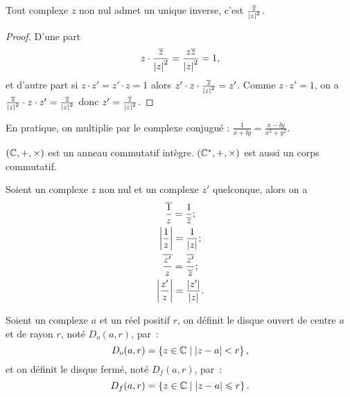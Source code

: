 %
\begin{prop}
  Tout complexe \(z\) non nul admet un unique inverse, c'est \(\frac{\overline{z}}{\left\lvert z\right\rvert^2}\).
\end{prop}
\begin{proof}
  D'une part
  \begin{equation}
    z \cdot \frac{\overline{z}}{\left\lvert z\right\rvert^2}=\frac{z \overline{z}}{\left\lvert z\right\rvert^2}=1,
  \end{equation}
  et d'autre part si \(z\cdot z'=z'\cdot z=1\) alors \(z'\cdot z\cdot \frac{\overline{z}}{\left\lvert z\right\rvert^2}=z'\). Comme \(z\cdot z'=1\), on a \( \frac{\overline{z}}{\left\lvert z\right\rvert^2}\cdot z\cdot z'=\frac{\overline{z}}{\left\lvert z\right\rvert^2}\) donc \(z'=\frac{\overline{z}}{\left\lvert z\right\rvert^2}\).
\end{proof}
En pratique, on multiplie par le complexe conjugué : \(\frac{1}{x+\ii y}=\frac{x -\ii y}{x^2+y^2}\).
%
\begin{prop}
  \((\mathbb{C},+,\times)\) est un anneau commutatif intègre. \((\mathbb{C}^*,+,\times)\) est aussi un corps commutatif.
\end{prop}
%
\begin{prop}
  Soient un complexe \(z\) non nul et un complexe \(z'\) quelconque, alors on a
  \begin{gather}
    \overline{\frac{1}{z}}=\frac{1}{\overline{z}}; \\
    \left\lvert\frac{1}{z}\right\rvert=\frac{1}{\left\lvert z\right\rvert}; \\
    \overline{\frac{z'}{z}} = \frac{\overline{z'}}{\overline{z}};\\
    \left\lvert\frac{z'}{z}\right\rvert=\frac{\left\lvert z'\right\rvert}{\left\lvert z\right\rvert}.
  \end{gather}
\end{prop}
%
\begin{defdef}
  Soient un complexe \(a\) et un réel positif \(r\), on définit le disque ouvert de centre \(a\) et de rayon \(r\), noté \(D_o(a,r)\), par~:
  \begin{equation}
    D_o(a,r)=\left\{z\in\mathbb{C}\mathrel{}\middle|\mathrel{}\left\lvert z-a\right\rvert<r\right\},
  \end{equation}
  et on définit le disque fermé, noté \(D_f(a,r)\), par~:
  \begin{equation}
    D_f(a,r)=\left\{z\in\mathbb{C}\mathrel{}\middle|\mathrel{}\left\lvert z-a\right\rvert\leqslant r\right\}.
  \end{equation}
\end{defdef}
%
